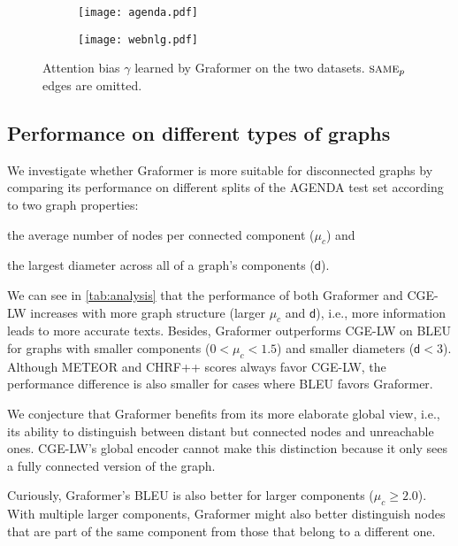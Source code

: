\documentclass[11pt]{article}
\newcommand{\sameEnt}{\textsc{same}}
\begin{document}
\begin{figure*}[t]
	\begin{subfigure}{.49\linewidth}
		\centering
		\texttt{[image: agenda.pdf]}
		\label{fig:attention-agenda}
	\end{subfigure}
\begin{subfigure}{.49\linewidth}
		\centering
		\texttt{[image: webnlg.pdf]}
		\label{fig:attention-webnlg}
	\end{subfigure}
	
	\caption{Attention bias $\gamma$ learned by Graformer on the two datasets. $\sameEnt{}_p$ edges are omitted.}
	\label{fig:attention}
\end{figure*}


\subsection{Performance on different types of graphs}

We investigate whether Graformer is more suitable for disconnected graphs
by comparing its performance on different splits of the AGENDA test set according to two graph properties:
\begin{enumerate*}[label=(\roman*)]
	\item the average number of nodes per connected component ($\mu_c$) and
	\item the largest diameter across all of a graph's components ($\mathsf{d}$).
\end{enumerate*}

We can see in \cref{tab:analysis} that
the performance of both Graformer and CGE-LW \citep{ribeiro20}
increases with more graph structure (larger $\mu_c$ and $\mathsf{d}$),
i.e., more information leads to more accurate texts.
Besides, Graformer outperforms CGE-LW on BLEU for graphs with smaller components ($0 < \mu_c < 1.5$)
and smaller diameters ($\mathsf{d}\! <\! 3$).
Although METEOR and CHRF++ scores always favor CGE-LW,
the performance difference is also smaller for cases where BLEU favors Graformer.

We conjecture that
Graformer benefits from its more elaborate global view,
i.e., its ability to distinguish between distant but connected nodes and unreachable ones.
CGE-LW's global encoder cannot make this distinction
because it only sees a fully connected version of the graph.

Curiously, Graformer's BLEU is also better for larger components ($\mu_c \geq 2.0$).
With multiple larger components,
Graformer might also better distinguish nodes that are part of the same component from those that belong to a different one.
\end{document}
